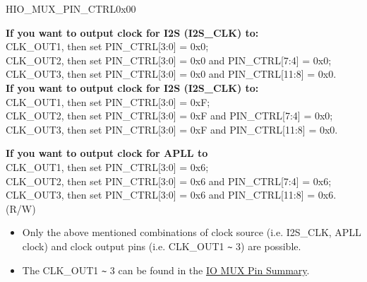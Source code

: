 \begin{register}{H}{IO\_MUX\_PIN\_CTRL}{0x00}\label{regdesc:IOMUXPINCTRL}
%
%
%
%
\regnewline%
\begin{regdesc}
{\bfseries If you want to output clock for I2S (I2S\_CLK) to:}\\
CLK\_OUT1, then set PIN\_CTRL[3:0] = 0x0;\\
CLK\_OUT2, then set PIN\_CTRL[3:0] = 0x0 and PIN\_CTRL[7:4] = 0x0;\\
CLK\_OUT3, then set PIN\_CTRL[3:0] = 0x0 and PIN\_CTRL[11:8] = 0x0.\\
{\bfseries If you want to output clock for I2S (I2S\_CLK) to:}\\
CLK\_OUT1, then set PIN\_CTRL[3:0] = 0xF;\\
CLK\_OUT2, then set PIN\_CTRL[3:0] = 0xF and PIN\_CTRL[7:4] = 0x0;\\
CLK\_OUT3, then set PIN\_CTRL[3:0] = 0xF and PIN\_CTRL[11:8] = 0x0. 

{\bfseries If you want to output clock for APLL to}\\
CLK\_OUT1, then set PIN\_CTRL[3:0] = 0x6;\\
CLK\_OUT2, then set PIN\_CTRL[3:0] = 0x6 and PIN\_CTRL[7:4] = 0x6;\\
CLK\_OUT3, then set PIN\_CTRL[3:0] = 0x6 and PIN\_CTRL[11:8] = 0x6. (R/W)
\end{regdesc}
\end{register}

\vspace{-2em}
\begin{tiplisting}
\vspace{-2em}
\begin{itemize}
    \item Only the above mentioned combinations of clock source (i.e. I2S\_CLK, APLL clock) and clock output pins (i.e. CLK\_OUT1 \verb+~+ 3) are possible.
    \item The CLK\_OUT1 \verb+~+ 3 can be found in the \hyperref[table:iomux_pads]{IO MUX Pin Summary}.
\end{itemize}
\end{tiplisting}
 

